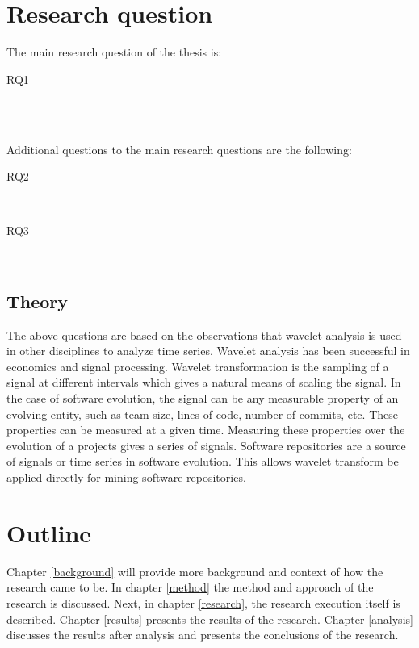 \section{Research question}

The main research question of the thesis is:
\begin{description}
	\item[RQ1] \hfill \\ \emph{\researchQuestion}
\end{description}

\noindent\\
Additional questions to the main research questions are the following:
\begin{description}
	\item[RQ2] \hfill \\ \emph{\subQuestionOne}
	\item[RQ3] \hfill \\ \emph{\subQuestionTwo}
\end{description}

\subsection{Theory}

The above questions are based on the observations that wavelet analysis is used
in other disciplines to analyze time series. Wavelet analysis has been
successful in economics and signal processing. Wavelet transformation is the
sampling of a signal at different intervals which gives a natural means of
scaling the signal. In the case of software evolution, the signal can be any
measurable property of an evolving entity, such as team size, lines of code,
number of commits, etc. These properties can be measured at a given time.
Measuring these properties over the evolution of a projects gives a series of
signals. Software repositories are a source of signals or time series in
software evolution. This allows wavelet transform be applied directly for mining
software repositories.

\section{Outline}

Chapter \ref{background} will provide more background and context of how the
research came to be. In chapter \ref{method} the method and approach of the
research is discussed. Next, in chapter \ref{research}, the research execution
itself is described. Chapter \ref{results} presents the results of the research.
Chapter \ref{analysis} discusses the results after analysis and presents the
conclusions of the research.

